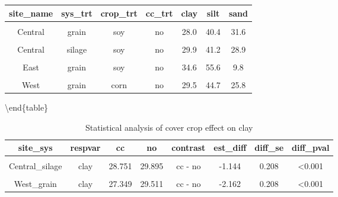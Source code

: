 \documentclass[
]{article}
\begin{document}
\begin{tabular}[t]{ccccccc}
\toprule
site\_name & sys\_trt & crop\_trt & cc\_trt & clay & silt & sand\\
\midrule
\cellcolor{gray!6}{Central} & \cellcolor{gray!6}{grain} & \cellcolor{gray!6}{soy} & \cellcolor{gray!6}{cc} & \cellcolor{gray!6}{27.7} & \cellcolor{gray!6}{39.8} & \cellcolor{gray!6}{32.5}\\
\cmidrule{1-7}
Central & grain & soy & no & 28.0 & 40.4 & 31.6\\
\cmidrule{1-7}
\cellcolor{gray!6}{Central} & \cellcolor{gray!6}{silage} & \cellcolor{gray!6}{soy} & \cellcolor{gray!6}{cc} & \cellcolor{gray!6}{28.8} & \cellcolor{gray!6}{41.3} & \cellcolor{gray!6}{29.9}\\
\cmidrule{1-7}
Central & silage & soy & no & 29.9 & 41.2 & 28.9\\
\cmidrule{1-7}
\cellcolor{gray!6}{East} & \cellcolor{gray!6}{grain} & \cellcolor{gray!6}{soy} & \cellcolor{gray!6}{cc} & \cellcolor{gray!6}{31.7} & \cellcolor{gray!6}{55.6} & \cellcolor{gray!6}{12.7}\\
\cmidrule{1-7}
East & grain & soy & no & 34.6 & 55.6 & 9.8\\
\cmidrule{1-7}
\cellcolor{gray!6}{West} & \cellcolor{gray!6}{grain} & \cellcolor{gray!6}{corn} & \cellcolor{gray!6}{cc} & \cellcolor{gray!6}{27.3} & \cellcolor{gray!6}{41.9} & \cellcolor{gray!6}{30.8}\\
\cmidrule{1-7}
West & grain & corn & no & 29.5 & 44.7 & 25.8\\
\bottomrule
\end{tabular}

\textbackslash end\{table\}

\begin{table}[H]

\caption{\label{tab:texture}Statistical analysis of cover crop effect on clay}
\centering
\begin{tabular}[t]{cccccccc}
\toprule
site\_sys & respvar & cc & no & contrast & est\_diff & diff\_se & diff\_pval\\
\midrule
\cellcolor{gray!6}{Central\_grain} & \cellcolor{gray!6}{clay} & \cellcolor{gray!6}{27.740} & \cellcolor{gray!6}{28.000} & \cellcolor{gray!6}{cc - no} & \cellcolor{gray!6}{-0.260} & \cellcolor{gray!6}{0.186} & \cellcolor{gray!6}{0.164}\\
Central\_silage & clay & 28.751 & 29.895 & cc - no & -1.144 & 0.208 & <0.001\\
\cellcolor{gray!6}{East\_grain} & \cellcolor{gray!6}{clay} & \cellcolor{gray!6}{31.730} & \cellcolor{gray!6}{34.606} & \cellcolor{gray!6}{cc - no} & \cellcolor{gray!6}{-2.876} & \cellcolor{gray!6}{0.208} & \cellcolor{gray!6}{<0.001}\\
West\_grain & clay & 27.349 & 29.511 & cc - no & -2.162 & 0.208 & <0.001\\
\bottomrule
\end{tabular}
\end{table}
\end{document}
